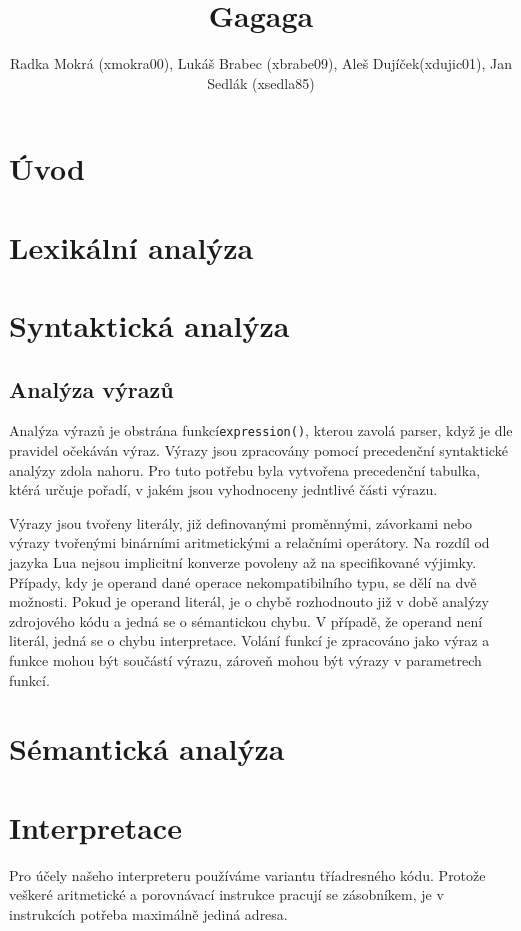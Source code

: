 \documentclass[a4paper,11pt,titlepage]{article}
\author{Radka Mokrá (xmokra00), Lukáš Brabec (xbrabe09), Aleš Dujíček(xdujic01), Jan Sedlák (xsedla85)}
\title{Gagaga}
\begin{document}


\tableofcontents

\newpage

\section{Úvod}

\section{Lexikální analýza}

\section{Syntaktická analýza}

\subsection{Analýza výrazů}
Analýza výrazů je obstrána funkcí{\tt expression()}, kterou zavolá parser, když je dle pravidel očekáván výraz. Výrazy jsou zpracovány pomocí precedenční syntaktické analýzy zdola nahoru. Pro tuto potřebu byla vytvořena precedenční tabulka, ktérá určuje pořadí, v jakém jsou vyhodnoceny jedntlivé části výrazu. 

Výrazy jsou tvořeny literály, již definovanými proměnnými, závorkami nebo výrazy tvořenými binárními aritmetickými a relačními operátory. Na rozdíl od jazyka Lua nejsou implicitní konverze povoleny až na specifikované výjimky. Případy, kdy je operand dané operace nekompatibilního typu, se dělí na dvě možnosti. Pokud je operand literál, je o chybě rozhodnouto již v době analýzy zdrojového kódu a jedná se o sémantickou chybu. V případě, že operand není literál, jedná se o chybu interpretace. 
Volání funkcí je zpracováno jako výraz a funkce mohou být součástí výrazu, zároveň mohou být výrazy v parametrech funkcí.

\section{Sémantická analýza}

\section{Interpretace}
Pro účely našeho interpreteru používáme variantu tříadresného kódu. Pro\-to\-že veškeré aritmetické a porovnávací instrukce pracují se zásobníkem, je v instrukcích potřeba maximálně jediná adresa.
\end{document}
